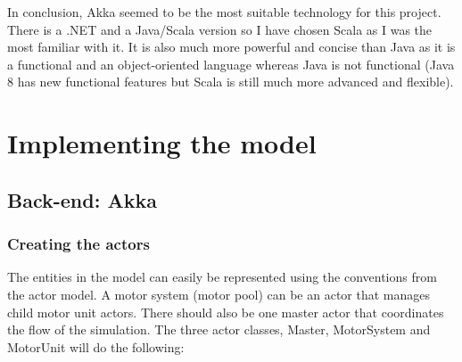 \documentclass[titlepage]{article}
\begin{document}
In conclusion, Akka seemed to be the most suitable technology for this project. There is a .NET and a Java/Scala version so I have chosen Scala as I was the most familiar with it. It is also much more powerful and concise than Java as it is a functional and an object-oriented language whereas Java is not functional (Java 8 has new functional features but Scala is still much more advanced and flexible). 

\section{Implementing the model}
\subsection{Back-end: Akka}
\subsubsection{Creating the actors}
The entities in the model can easily be represented using the conventions from the actor model. A motor system (motor pool) can be an actor that manages child motor unit actors. There should also be one master actor that coordinates the flow of the simulation. The three actor classes, Master, MotorSystem and MotorUnit will do the following:
\end{document}

